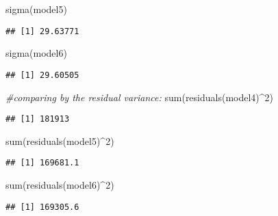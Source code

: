 \documentclass[
]{article}
\newenvironment{Shaded}{\begin{snugshade}}{\end{snugshade}}
\newcommand{\CommentTok}[1]{\textcolor[rgb]{0.56,0.35,0.01}{\textit{#1}}}
\newcommand{\DecValTok}[1]{\textcolor[rgb]{0.00,0.00,0.81}{#1}}
\newcommand{\FunctionTok}[1]{\textcolor[rgb]{0.00,0.00,0.00}{#1}}
\newcommand{\NormalTok}[1]{#1}
\newcommand{\SpecialCharTok}[1]{\textcolor[rgb]{0.00,0.00,0.00}{#1}}
\begin{document}
\begin{Shaded}
\begin{Highlighting}[]
\FunctionTok{sigma}\NormalTok{(model5)}
\end{Highlighting}
\end{Shaded}

\begin{verbatim}
## [1] 29.63771
\end{verbatim}

\begin{Shaded}
\begin{Highlighting}[]
\FunctionTok{sigma}\NormalTok{(model6)}
\end{Highlighting}
\end{Shaded}

\begin{verbatim}
## [1] 29.60505
\end{verbatim}

\begin{Shaded}
\begin{Highlighting}[]
\CommentTok{\#comparing by the residual variance:}
\FunctionTok{sum}\NormalTok{(}\FunctionTok{residuals}\NormalTok{(model4)}\SpecialCharTok{\^{}}\DecValTok{2}\NormalTok{)}
\end{Highlighting}
\end{Shaded}

\begin{verbatim}
## [1] 181913
\end{verbatim}

\begin{Shaded}
\begin{Highlighting}[]
\FunctionTok{sum}\NormalTok{(}\FunctionTok{residuals}\NormalTok{(model5)}\SpecialCharTok{\^{}}\DecValTok{2}\NormalTok{)}
\end{Highlighting}
\end{Shaded}

\begin{verbatim}
## [1] 169681.1
\end{verbatim}

\begin{Shaded}
\begin{Highlighting}[]
\FunctionTok{sum}\NormalTok{(}\FunctionTok{residuals}\NormalTok{(model6)}\SpecialCharTok{\^{}}\DecValTok{2}\NormalTok{)}
\end{Highlighting}
\end{Shaded}

\begin{verbatim}
## [1] 169305.6
\end{verbatim}
\end{document}
